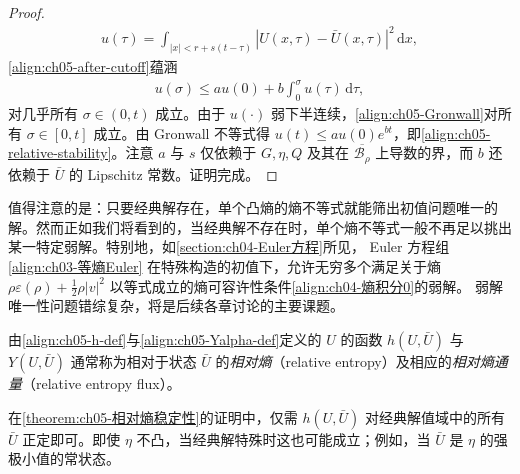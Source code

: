 \documentclass[../../main.tex]{subfiles}
\begin{document}
\begin{proof}
\begin{align}
u(\tau)=\int_{|x|<r+s(t-\tau)}|U(x,\tau)-\bar{U}(x,\tau)|^{2}\,\mathrm{d}x,\label{align:ch05-u-def}
\end{align}
\eqref{align:ch05-after-cutoff}蕴涵
\begin{align}
u(\sigma)\leqslant au(0)+b\int_{0}^{\sigma}u(\tau)\,\mathrm{d}\tau,\label{align:ch05-Gronwall}
\end{align}
对几乎所有 $\sigma\in(0,t)$ 成立。由于 $u(\cdot)$ 弱下半连续，\eqref{align:ch05-Gronwall}对所有 $\sigma\in[0,t]$ 成立。由 Gronwall 不等式得 $u(t)\leqslant au(0)e^{bt}$，即\eqref{align:ch05-relative-stability}。注意 $a$ 与 $s$ 仅依赖于 $G,\eta,Q$ 及其在 $\overline{\mathscr{B}_{\rho}}$ 上导数的界，而 $b$ 还依赖于 $\bar{U}$ 的 Lipschitz 常数。证明完成。
\end{proof}

值得注意的是：只要经典解存在，单个凸熵的熵不等式就能筛出初值问题唯一的解。然而正如我们将看到的，当经典解不存在时，单个熵不等式一般不再足以挑出某一特定弱解。特别地，如\cref{section:ch04-Euler方程}所见，
Euler 方程组\eqref{align:ch03-等熵Euler}
在特殊构造的初值下，允许无穷多个满足关于熵 $\rho\varepsilon(\rho)+\frac{1}{2}\rho|v|^{2}$ 以等式成立的熵可容许性条件\eqref{align:ch04-熵积分0}的弱解。
弱解唯一性问题错综复杂，将是后续各章讨论的主要课题。

由\eqref{align:ch05-h-def}与\eqref{align:ch05-Yalpha-def}定义的 $U$ 的函数 $h(U,\bar{U})$ 与 $Y(U,\bar{U})$ 通常称为相对于状态 $\bar{U}$ 的\emph{相对熵}（relative entropy）及相应的\emph{相对熵通量}（relative entropy flux）。

\begin{remark}\label{remark:ch05-相对熵正定}
在\cref{theorem:ch05-相对熵稳定性}的证明中，仅需 $h(U,\bar{U})$ 对经典解值域中的所有 $\bar{U}$ 正定即可。即使 $\eta$ 不凸，当经典解特殊时这也可能成立；例如，当 $\bar{U}$ 是 $\eta$ 的强极小值的常状态。
\end{remark}
\end{document}
